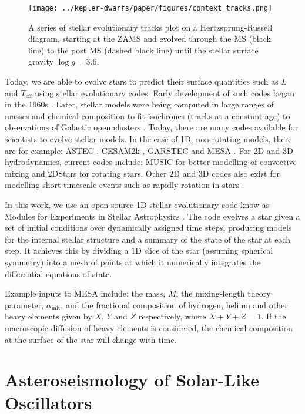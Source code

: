\begin{figure}[ht]
    \centering
    \texttt{[image: ../kepler-dwarfs/paper/figures/context\_tracks.png]}
    \caption{A series of stellar evolutionary tracks plot on a Hertzsprung-Russell diagram, starting at the ZAMS and evolved through the MS (black line) to the post MS (dashed black line) until the stellar surface gravity $\log g=3.6$.}
    \label{fig:track}
\end{figure}

Today, we are able to evolve stars to predict their surface quantities such as $L$ and $T_\mathrm{eff}$ using stellar evolutionary codes. Early development of such codes began in the 1960s \citep[see e.g.][]{Kippenhahn.Weigert.ea1967}. Later, stellar models were being computed in large ranges of masses and chemical composition to fit isochrones (tracks at a constant age) to observations of Galactic open clusters \citep{Vandenberg1985}. Today, there are many codes available for scientists to evolve stellar models. In the case of 1D, non-rotating models, there are for example: ASTEC \citep{Christensen-Dalsgaard2008}, CESAM2k \citep{Morel.Lebreton2008}, GARSTEC \citep{Weiss.Schlattl2008} and MESA \citep{Paxton.Bildsten.ea2011}. For 2D and 3D hydrodynamics, current codes include: MUSIC \citep{Baraffe.Pratt.ea2017} for better modelling of convective mixing and 2DStars \citep{Halabi.Izzard.ea2017} for rotating stars. Other 2D and 3D codes also exist for modelling short-timescale events such as rapidly rotation in stars \citep{Roxburgh2004}.

In this work, we use an open-source 1D stellar evolutionary code know as Modules for Experiments in Stellar Astrophysics \citep[MESA;][]{Paxton.Bildsten.ea2011}. The code evolves a star given a set of initial conditions over dynamically assigned time steps, producing models for the internal stellar structure and a summary of the state of the star at each step. It achieves this by dividing a 1D slice of the star (assuming spherical symmetry) into a mesh of points at which it numerically integrates the differential equations of state. 

Example inputs to MESA include: the mass, $M$, the mixing-length theory parameter, $\alpha_\mathrm{mlt}$, and the fractional composition of hydrogen, helium and other heavy elements given by $X$, $Y$ and $Z$ respectively, where $X+Y+Z=1$. If the macroscopic diffusion of heavy elements is considered, the chemical composition at the surface of the star will change with time.

\section{Asteroseismology of Solar-Like Oscillators}\label{sec:seismo}

